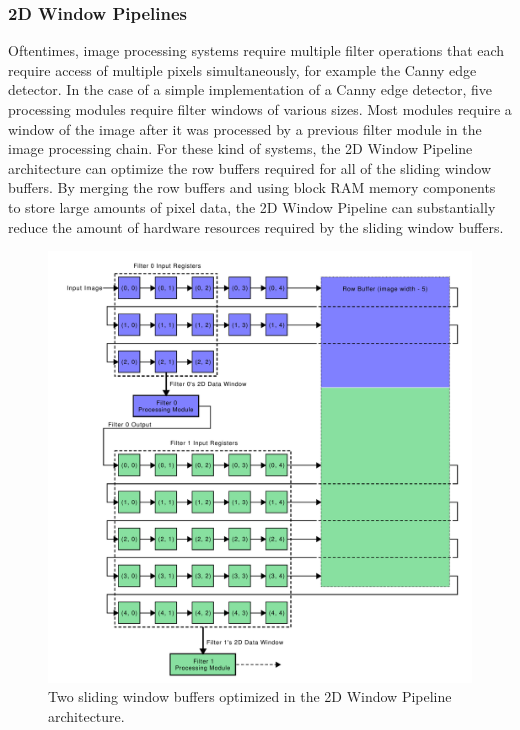 \subsubsection{2D Window Pipelines}

Oftentimes, image processing systems require multiple filter operations that each require access of multiple pixels simultaneously, for example the Canny edge detector.
In the case of a simple implementation of a Canny edge detector, five processing modules require filter windows of various sizes.
Most modules require a window of the image after it was processed by a previous filter module in the image processing chain.
For these kind of systems, the 2D Window Pipeline architecture can optimize the row buffers required for all of the sliding window buffers.
By merging the row buffers and using block RAM memory components to store large amounts of pixel data, the 2D Window Pipeline can substantially reduce the amount of hardware resources required by the sliding window buffers.

\begin{figure}[htbp]
\centering
\includegraphics[width=\textwidth]{figs/02-window_buffers_opt_visual.pdf}
\caption{Two sliding window buffers optimized in the 2D Window Pipeline architecture.}
\label{fig:02-buffers_optimized}
\end{figure}

